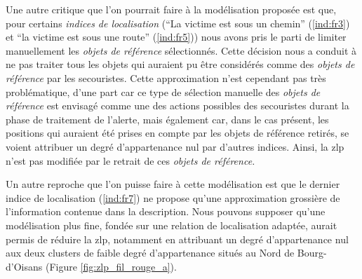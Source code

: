 Une autre critique que l'on pourrait faire à la modélisation proposée
est que, pour certains \emph{indices de localisation} (\enquote{La
  victime est sous un chemin} (\ref{ind:fr3}) et \enquote{la victime
  est sous une route} (\ref{ind:fr5})) nous avons pris le parti de
limiter manuellement les \emph{objets de référence}
sélectionnés. Cette décision nous a conduit à ne pas traiter tous les
objets qui auraient pu être considérés comme des \emph{objets de
  référence} par les secouristes. Cette approximation n'est cependant
pas très problématique, d'une part car ce type de sélection manuelle
des \emph{objets de référence} est envisagé comme une des actions
possibles des secouristes durant la phase de traitement de l'alerte,
mais également car, dans le cas présent, les positions qui auraient
été prises en compte par les objets de référence retirés, se voient
attribuer un degré d'appartenance nul par d'autres indices. Ainsi, la
\ac{zlp} n'est pas modifiée par le retrait de ces \emph{objets de
  référence.}

Un autre reproche que l'on puisse faire à cette modélisation est que
le dernier indice de localisation (\ref{ind:fr7}) ne propose qu'une
approximation grossière de l'information contenue dans la
description. Nous pouvons supposer qu'une modélisation plus fine,
fondée sur une relation de localisation adaptée, aurait permis de
réduire la \ac{zlp}, notamment en attribuant un degré d'appartenance
nul aux deux clusters de faible degré d'appartenance situés au Nord de
Bourg-d'Oisans (Figure \ref{fig:zlp_fil_rouge_a}).

